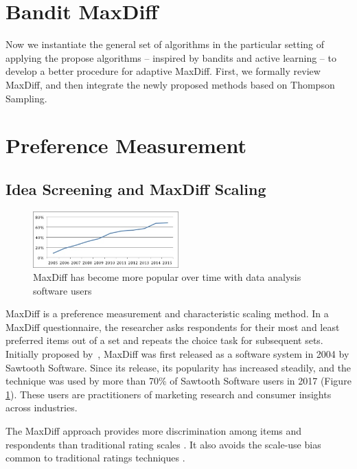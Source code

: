 \documentclass[nonblindrev]{informs3}
\begin{document}
\section{Bandit MaxDiff}

Now we instantiate the general set of algorithms in the particular setting of applying the propose algorithms -- inspired by bandits and active learning -- to develop a better procedure for adaptive MaxDiff. First, we formally review MaxDiff, and then integrate the newly proposed methods based on Thompson Sampling.


\section{Preference Measurement}
\subsection{Idea Screening and MaxDiff Scaling}
\begin{figure}
\caption{MaxDiff has become more popular over time with data analysis software users} \label{fig:pop}
\begin{center}
\includegraphics[width=0.5\textwidth]{plots/maxdiffpop}
\end{center}
\end{figure}
MaxDiff is a preference measurement and characteristic scaling method. In a MaxDiff questionnaire, the researcher asks respondents for their most and least preferred items out of a set and repeats the choice task for subsequent sets. Initially proposed by~\cite{louviere1991best}, MaxDiff was first released as a software system in 2004 by Sawtooth Software. Since its release, its popularity has increased steadily, and the technique was used by more than 70\% of Sawtooth Software users in 2017 (Figure \ref{fig:pop}). These users are practitioners of marketing research and consumer insights across industries.

The MaxDiff approach provides more discrimination among items and respondents than traditional rating scales \citep{cohen2004s}. It also avoids the scale-use bias common to traditional ratings techniques \citep{marley2005some,chrzan2006empirical}.
\end{document}
